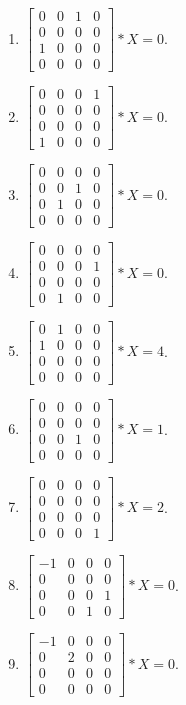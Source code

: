 \begin{multicols}{3}\begin{enumerate}
\item $\begin{bmatrix}
0&0 &1 &0\\
0&0&0 &0\\
1&0&0&0\\
0&0&0&0
\end{bmatrix} \ast X = 0$.
\item $\begin{bmatrix}0&0 &0 &1\\
0&0&0 &0\\
0&0&0&0\\
1&0&0&0
\end{bmatrix} \ast X = 0$.
\item $\begin{bmatrix}
0&0 &0 &0\\
0&0&1 &0\\
0&1&0&0\\
0&0&0&0
\end{bmatrix} \ast X = 0$.
\item $\begin{bmatrix}0&0 &0 &0\\
0&0&0 &1\\
0&0&0&0\\
0&1&0&0
\end{bmatrix}\ast X = 0$.
\item $\begin{bmatrix}
0&1 &0 &0\\
1&0&0 &0\\
0&0&0&0\\
0&0&0&0
\end{bmatrix}\ast X = 4$. 
\item $\begin{bmatrix}
0&0 &0 &0\\
0&0&0 &0\\
0&0&1&0\\
0&0&0&0
\end{bmatrix}\ast X = 1$.
\item $\begin{bmatrix}
0&0 &0 &0\\
0&0&0 &0\\
0&0&0&0\\
0&0&0&1
\end{bmatrix}\ast X = 2$.
\item $\begin{bmatrix}
-1&0 &0 &0\\
0&0&0 &0\\
0&0&0&1\\
0&0&1&0
\end{bmatrix}\ast X = 0$.
\item $\begin{bmatrix}
-1&0 &0 &0\\
0&2&0 &0\\
0&0&0&0\\
0&0&0&0
\end{bmatrix}\ast X = 0$.
\end{enumerate}\end{multicols}

